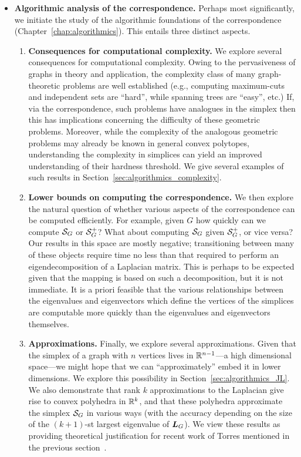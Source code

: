 \begin{itemize}
	\item {\bf Algorithmic analysis of the correspondence.} Perhaps most significantly, we initiate the study of the algorithmic foundations of the correspondence (Chapter~\ref{chap:algorithmics}). This entails three distinct aspects. 
	\begin{enumerate}
		\item {\bf Consequences for computational complexity.}	We explore several consequences for computational  complexity.  Owing to the pervasiveness of graphs in theory and application, the complexity class of many graph-theoretic problems are  well established (e.g., computing maximum-cuts and independent sets are ``hard'', while spanning trees are ``easy'', etc.) If, via the correspondence, such problems have analogues in the simplex then this has implications concerning the difficulty of these geometric problems. Moreover, while the complexity of  the analogous geometric problems may already  be known in general convex polytopes, understanding the complexity in simplices can yield an improved understanding of their hardness threshold. We give several examples of such results in Section~\ref{sec:algorithmics_complexity}. 
		\item {\bf Lower bounds on computing the correspondence.} We then explore the natural question of whether various aspects of the correspondence can be computed efficiently. For example, given $G$ how quickly can we compute $\mathcal{S}_G$ or $\mathcal{S}_G^+$? What about computing $\mathcal{S}_G$ given $\mathcal{S}_G^+$, or vice  versa? Our results in this  space are mostly negative; transitioning between many of these objects require time no less than that required to perform an eigendecomposition of a Laplacian matrix. 
		This is perhaps to be expected given that the mapping is based on such a decomposition, but it is not immediate.  It is a priori  feasible that the various relationships between the eigenvalues and eigenvectors which define the vertices of  the simplices are computable more quickly than the eigenvalues and eigenvectors  themselves. 
		\item {\bf Approximations.} Finally, we explore several approximations. Given that  the simplex of a graph with $n$ vertices lives in $\mathbb{R}^{n-1}$---a high dimensional  space---we might hope that we can ``approximately'' embed it  in  lower dimensions. We explore this possibility in Section~\ref{sec:algorithmics_JL}. We also demonstrate that rank $k$ approximations  to  the Laplacian give rise to convex polyhedra in $\mathbb{R}^k$, and that these polyhedra approximate the simplex $\mathcal{S}_G$ in various ways (with the accuracy depending on the  size of the $(k+1)$-st  largest  eigenvalue of $\vb*{L}_G$). We view these results as providing theoretical justification for recent work of Torres \etal mentioned  in  the previous section~\cite{torres2019geometric}.  
	\end{enumerate}

\end{itemize}



